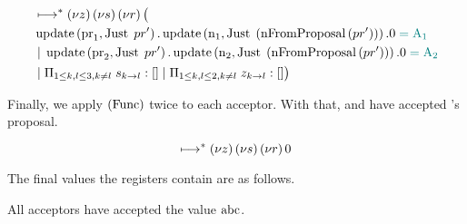 \begin{align*}
&\mapstostar \NuChannels \big (\\
&
    \update{\ProposalRegister_1}{\Just{pr'}}.
    \update{\NumberRegister_1}{\Just{\Paren{\nFromProposal{pr'}}}}.
    \End
    \comment{= \Acceptor{1}}\\
&\Or
    \update{\ProposalRegister_2}{\Just{pr'}}.
    \update{\NumberRegister_2}{\Just{\Paren{\nFromProposal{pr'}}}}.
    \End
    \comment{= \Acceptor{2}}\\
&\Or \InnerSessionQueues{\ChannelS}
\Or \OuterSessionQueues
\big )
\end{align*}

Finally, we apply $\RSideEffect$ twice to each acceptor.
With that,  and  have accepted 's proposal.

\[\mapstostar \NuChannels \End\]

The final values the registers contain are as follows.


All acceptors have accepted the value $\ABC$.
